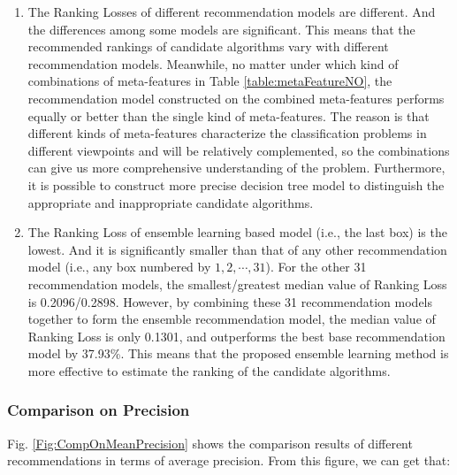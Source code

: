 \documentclass[acmsmall]{acmart}
\begin{document}
\begin{enumerate}
	\item The Ranking Losses of different recommendation models are
	different. And the differences among some models are
	significant. This means that the recommended rankings of candidate algorithms
	vary with different recommendation models. Meanwhile, no matter
	under which kind of combinations of meta-features in Table
	\ref{table:metaFeatureNO}, the recommendation model constructed on the combined meta-features
	performs equally or better than the single kind of
	meta-features. The reason is that different kinds of
	meta-features characterize the classification problems in different
	viewpoints and will be relatively complemented, so the combinations can give us more
	comprehensive understanding of the problem. Furthermore, it is
	possible to construct more precise decision tree model to
	distinguish the appropriate and inappropriate candidate algorithms.
	
	\item The Ranking Loss of ensemble learning based model (i.e., the last box) is the
	lowest. And it is significantly smaller than that of any other
	recommendation model (i.e., any box numbered by
	$1,2,\cdots,31$). For the other 31 recommendation models, the
	smallest/greatest median value of Ranking Loss is 0.2096/0.2898.
	However, by combining these 31 recommendation models together
	to form the ensemble recommendation model, the median value of
	Ranking Loss is only 0.1301, and outperforms the best base
	recommendation model by 37.93\%. This means that the proposed ensemble learning
	method is more effective to estimate the ranking of the
	candidate algorithms.
\end{enumerate}


\subsubsection{Comparison on Precision}

Fig. \ref{Fig:CompOnMeanPrecision} shows the comparison results of
different recommendations in terms of average precision. From this
figure, we can get that:
\end{document}
